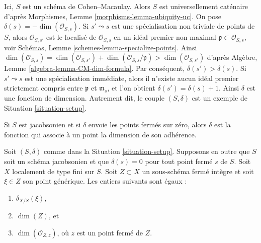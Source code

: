 \begin{example}
\label{example-CM-irreducible}
Ici, $S$ est un schéma de Cohen--Macaulay. Alors $S$ est universellement caténaire d'après
Morphismes, Lemme \ref{morphisms-lemma-ubiquity-uc}.
On pose $\delta(s) = -\dim(\mathcal{O}_{S, s})$.
Si $s' \leadsto s$ est une spécialisation non triviale de points de $S$,
alors $\mathcal{O}_{S, s'}$ est le localisé de $\mathcal{O}_{S, s}$
en un idéal premier non maximal $\mathfrak p \subset \mathcal{O}_{S, s}$, voir
Schémas, Lemme \ref{schemes-lemma-specialize-points}.
Ainsi $\dim(\mathcal{O}_{S, s}) =
\dim(\mathcal{O}_{S, s'}) + \dim(\mathcal{O}_{S, s}/\mathfrak p) >
\dim(\mathcal{O}_{S, s'})$ d'après
Algèbre, Lemme \ref{algebra-lemma-CM-dim-formula}.
Par conséquent, $\delta(s') > \delta(s)$. Si $s' \leadsto s$ est
une spécialisation immédiate, alors il n'existe aucun idéal
premier strictement compris entre $\mathfrak p$ et $\mathfrak m_s$,
et l'on obtient $\delta(s') = \delta(s) + 1$. Ainsi $\delta$
est une fonction de dimension. Autrement dit, le couple $(S, \delta)$
est un exemple de Situation \ref{situation-setup}.
\end{example}

\noindent
Si $S$ est jacobsonien et si $\delta$ envoie les points fermés sur zéro, alors $\delta$
est la fonction qui associe à un point la dimension de son adhérence.

\begin{lemma}
\label{lemma-delta-is-dimension}
Soit $(S, \delta)$ comme dans la Situation \ref{situation-setup}.
Supposons en outre que $S$ soit un schéma jacobsonien et que $\delta(s) = 0$ pour tout
point fermé $s$ de $S$. Soit $X$ localement de type fini sur $S$.
Soit $Z \subset X$ un sous-schéma fermé intègre et soit
$\xi \in Z$ son point générique. Les entiers suivants sont égaux :
\begin{enumerate}
\item $\delta_{X/S}(\xi)$,
\item $\dim(Z)$, et
\item $\dim(\mathcal{O}_{Z, z})$, où $z$ est un point fermé de $Z$.
\end{enumerate}
\end{lemma}

